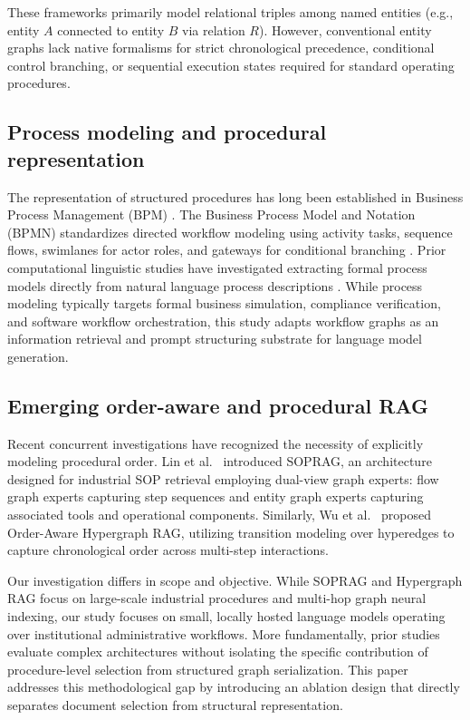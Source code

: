 \documentclass[preprint,10pt]{elsarticle}
\begin{document}
These frameworks primarily model relational triples among named entities (e.g., entity $A$ connected to entity $B$ via relation $R$). However, conventional entity graphs lack native formalisms for strict chronological precedence, conditional control branching, or sequential execution states required for standard operating procedures.

\subsection{Process modeling and procedural representation}
The representation of structured procedures has long been established in Business Process Management (BPM) \cite{dumas2018fundamentals}. The Business Process Model and Notation (BPMN) standardizes directed workflow modeling using activity tasks, sequence flows, swimlanes for actor roles, and gateways for conditional branching \cite{omg2011bpmn}. Prior computational linguistic studies have investigated extracting formal process models directly from natural language process descriptions \cite{friedrich2011process}. While process modeling typically targets formal business simulation, compliance verification, and software workflow orchestration, this study adapts workflow graphs as an information retrieval and prompt structuring substrate for language model generation.

\subsection{Emerging order-aware and procedural RAG}
Recent concurrent investigations have recognized the necessity of explicitly modeling procedural order. Lin et al.\ \cite{lin2026sedrag} introduced SOPRAG, an architecture designed for industrial SOP retrieval employing dual-view graph experts: flow graph experts capturing step sequences and entity graph experts capturing associated tools and operational components. Similarly, Wu et al.\ \cite{wu2026okhrag} proposed Order-Aware Hypergraph RAG, utilizing transition modeling over hyperedges to capture chronological order across multi-step interactions.

Our investigation differs in scope and objective. While SOPRAG and Hypergraph RAG focus on large-scale industrial procedures and multi-hop graph neural indexing, our study focuses on small, locally hosted language models operating over institutional administrative workflows. More fundamentally, prior studies evaluate complex architectures without isolating the specific contribution of procedure-level selection from structured graph serialization. This paper addresses this methodological gap by introducing an ablation design that directly separates document selection from structural representation.
\end{document}
